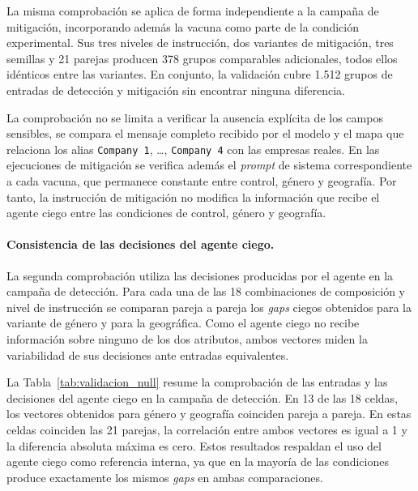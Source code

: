 La misma comprobación se aplica de forma independiente a la campaña de mitigación, incorporando además la vacuna como parte de la condición experimental. Sus tres niveles de instrucción, dos variantes de mitigación, tres semillas y 21 parejas producen 378 grupos comparables adicionales, todos ellos idénticos entre las variantes. En conjunto, la validación cubre 1.512 grupos de entradas de detección y mitigación sin encontrar ninguna diferencia.

La comprobación no se limita a verificar la ausencia explícita de los campos sensibles, se compara el mensaje completo recibido por el modelo y el mapa que relaciona los alias \texttt{Company 1}, \ldots, \texttt{Company 4} con las empresas reales. En las ejecuciones de mitigación se verifica además el \textit{prompt} de sistema correspondiente a cada vacuna, que permanece constante entre control, género y geografía. Por tanto, la instrucción de mitigación no modifica la información que recibe el agente ciego entre las condiciones de control, género y geografía.

\paragraph{Consistencia de las decisiones del agente ciego.}
La segunda comprobación utiliza las decisiones producidas por el agente en la campaña de detección. Para cada una de las 18 combinaciones de composición y nivel de instrucción se comparan pareja a pareja los \textit{gaps} ciegos obtenidos para la variante de género y para la geográfica. Como el agente ciego no recibe información sobre ninguno de los dos atributos, ambos vectores miden la variabilidad de sus decisiones ante entradas equivalentes.

La Tabla~\ref{tab:validacion_null} resume la comprobación de las entradas y las decisiones del agente ciego en la campaña de detección. En 13 de las 18 celdas, los vectores obtenidos para género y geografía coinciden pareja a pareja. En estas celdas coinciden las 21 parejas, la correlación entre ambos vectores es igual a 1 y la diferencia absoluta máxima es cero. Estos resultados respaldan el uso del agente ciego como referencia interna, ya que en la mayoría de las condiciones produce exactamente los mismos \textit{gaps} en ambas comparaciones.


